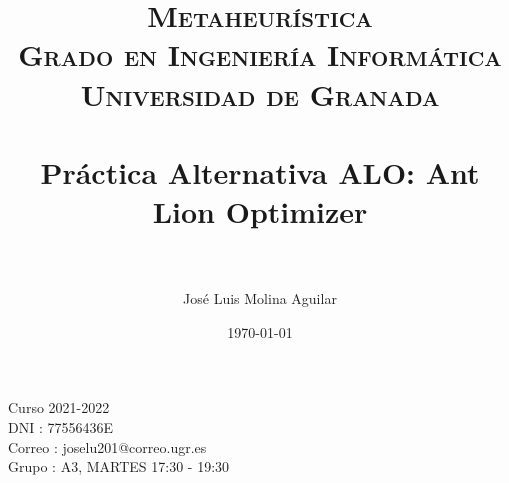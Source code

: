 

\everymath{\displaystyle}

\title{	
\normalfont \normalsize 
\textsc{\textbf{Metaheurística} \\ Grado en Ingeniería Informática \\ Universidad de Granada} \\ [25pt] %
\horrule{0.5pt} \\[0.4cm] %
\huge Práctica Alternativa ALO: Ant Lion Optimizer \\ %
\horrule{2pt} \\[0.5cm] %
}

\author{José Luis Molina Aguilar} %

\date{\normalsize\today} %






\maketitle %
  \begin{large}
    \centering
  \vfill
  
  Curso 2021-2022\\
  DNI : 77556436E\\
  Correo : joselu201@correo.ugr.es\\
  Grupo : A3, MARTES 17:30 - 19:30
  \vfill
  \end{large}
\newpage %

\tableofcontents %

\listoffigures


\newpage




